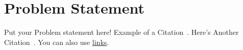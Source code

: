 \section*{Problem Statement}
Put your Problem statement here! Example of a Citation~\cite[p.219]{weiss2015write}. Here's Another Citation~\cite{staub1920write}. You can also use \href{https://www.sharelatex.com/learn/Hyperlinks}{links}.